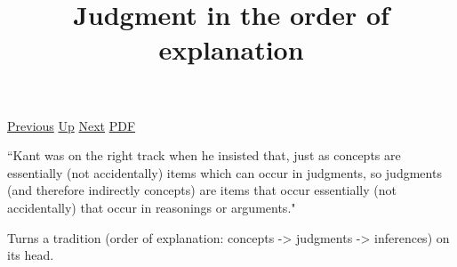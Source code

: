 \documentclass[12pt,a4paper]{report}
\begin{document}
 \href{doc/phil/People/Sellars/Quotes/Issemanticspsychological.html}{Previous} 
 \href{doc/phil/People/Sellars/Quotes.html}{Up} 
 \href{doc/phil/People/Sellars/Quotes/LabelingvsDescribing.html}{Next} 
 \href{doc/phil/People/Sellars/Quotes/Judgmentintheorderofexplanation.pdf}{PDF} 
\title{Judgment in the order of explanation}

``Kant was on the right track when he insisted that, just as concepts are
essentially (not accidentally) items which can occur in judgments, so judgments
(and therefore indirectly concepts) are items that occur essentially (not
accidentally) that occur in reasonings or arguments."

Turns a tradition (order of explanation: concepts -> judgments -> inferences)
on its head.
\end{document}
